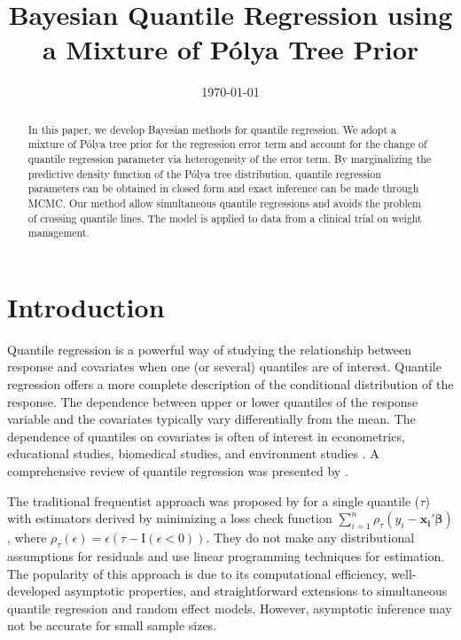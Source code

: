 \documentclass[12pt]{article}
\title{Bayesian Quantile Regression using a  Mixture of P\'{o}lya Tree Prior}
\date{\today}
\author{}
\newcommand{\polya}{P\'{o}lya}
\begin{document}

\maketitle{}

\begin{abstract}
In this paper, we develop Bayesian methods for quantile regression.
We adopt a mixture of \polya{} tree prior for the regression error term
and account for the change of quantile regression parameter via heterogeneity of the error term.
By marginalizing the predictive density function of the \polya{} tree distribution,
quantile regression parameters can be obtained in closed form and exact inference can be made through MCMC.
Our method allow simultaneous quantile regressions and avoids the problem of crossing quantile lines.
The model is applied to data from a clinical trial on weight management.
\end{abstract}

\section{Introduction}

Quantile regression is a powerful way of studying the relationship
between response and covariates when one (or several) quantiles are of
interest.
Quantile regression offers a more complete description of the
conditional distribution of the response.
The dependence between upper or lower quantiles of the
response variable and the covariates typically vary
differentially from the mean. The dependence of quantiles on covariates is often of
interest in econometrics, educational studies, biomedical studies, and
environment studies \citep{yu2001,buchinsky1994,
  buchinsky1998,he1998,koenker1999, wei2006, yu2003}.  A comprehensive
review of quantile regression was presented by \citet{koenker2005}.

The traditional frequentist approach was proposed by
\citet{koenker1978} for a single quantile ($\tau$) with estimators
derived by minimizing a loss check function $\sum_{i=1}^n
\rho_{\tau}(y_i - \bm{x_i\prime\beta})$, where $\rho_{\tau}(\epsilon) =
\epsilon (\tau- \mathrm{I}(\epsilon < 0))$. They do not make any
distributional assumptions for residuals and use linear programming
techniques for estimation.  The popularity of this approach is due to
its computational efficiency, well-developed asymptotic properties,
and straightforward extensions to simultaneous quantile regression and
random effect models. However, asymptotic inference may not be
accurate for small sample sizes.
\end{document}
